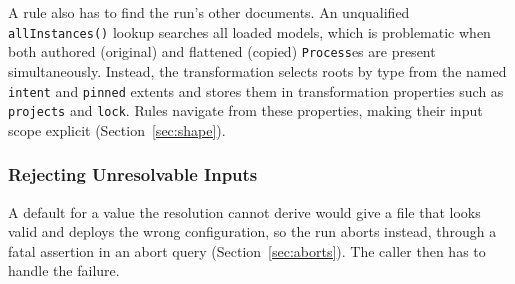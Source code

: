 A rule also has to find the run's other documents. An unqualified
\texttt{allInstances()} lookup searches all loaded models, which is problematic when both authored (original) and flattened (copied) \texttt{Process}es are present simultaneously. Instead, the transformation selects roots by type from the
named \texttt{intent} and \texttt{pinned} extents and stores them in
transformation properties such as \texttt{projects} and \texttt{lock}.
Rules navigate from these properties, making their input scope explicit
(Section~\ref{sec:shape}).

\subsubsection{Rejecting Unresolvable Inputs}
\label{sec:abortsalternative}

A default for a value the resolution cannot derive would give a file that
looks valid and deploys the wrong configuration, so the run aborts instead,
through a fatal assertion in an abort query (Section~\ref{sec:aborts}). The
caller then has to handle the failure.
